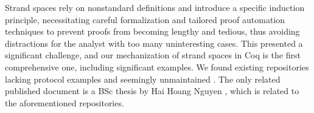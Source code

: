 Strand spaces rely on nonstandard definitions and introduce a specific induction principle, necessitating careful formalization and tailored proof automation techniques to prevent proofs from becoming lengthy and tedious, thus avoiding distractions for the analyst with too many uninteresting cases. This presented a significant challenge, and our mechanization of strand spaces in Coq is the first comprehensive one, including significant examples.
We found existing repositories lacking protocol examples and seemingly unmaintained \cite{kentstrands,nguyenauthtests,nguyenstrands}. The only related published document is a BSc thesis by Hai Hoang Nguyen \cite{nguyenthesis}, which is related to the aforementioned repositories.








